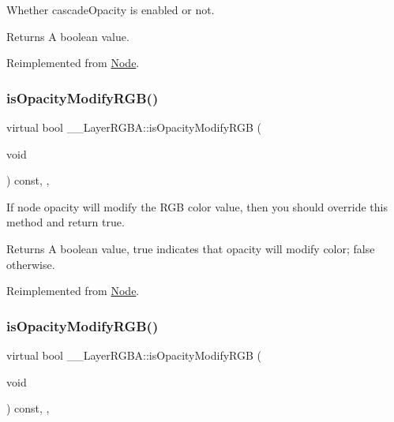 Whether cascade\+Opacity is enabled or not. \begin{DoxyReturn}{Returns}
A boolean value. 
\end{DoxyReturn}


Reimplemented from \hyperlink{classNode_a79f5da3b20b08356467db7ce95cf9f54}{Node}.

\mbox{\label{class____LayerRGBA_a014dba2472f2708ad4493e97ca5999b0}} 
\subsubsection{\texorpdfstring{is\+Opacity\+Modify\+R\+G\+B()}{isOpacityModifyRGB()}\hspace{0.1cm}{\footnotesize\ttfamily [1/2]}}
{\footnotesize\ttfamily virtual bool \+\_\+\+\_\+\+Layer\+R\+G\+B\+A\+::is\+Opacity\+Modify\+R\+GB (\begin{DoxyParamCaption}\item[{void}]{ }\end{DoxyParamCaption}) const\hspace{0.3cm}{\ttfamily [inline]}, {\ttfamily [override]}, {\ttfamily [virtual]}}

If node opacity will modify the R\+GB color value, then you should override this method and return true. \begin{DoxyReturn}{Returns}
A boolean value, true indicates that opacity will modify color; false otherwise. 
\end{DoxyReturn}


Reimplemented from \hyperlink{classNode_ae6ce32d2088e2bb3426608334f1091c5}{Node}.

\mbox{\label{class____LayerRGBA_a014dba2472f2708ad4493e97ca5999b0}} 
\subsubsection{\texorpdfstring{is\+Opacity\+Modify\+R\+G\+B()}{isOpacityModifyRGB()}\hspace{0.1cm}{\footnotesize\ttfamily [2/2]}}
{\footnotesize\ttfamily virtual bool \+\_\+\+\_\+\+Layer\+R\+G\+B\+A\+::is\+Opacity\+Modify\+R\+GB (\begin{DoxyParamCaption}\item[{void}]{ }\end{DoxyParamCaption}) const\hspace{0.3cm}{\ttfamily [inline]}, {\ttfamily [override]}, {\ttfamily [virtual]}}


